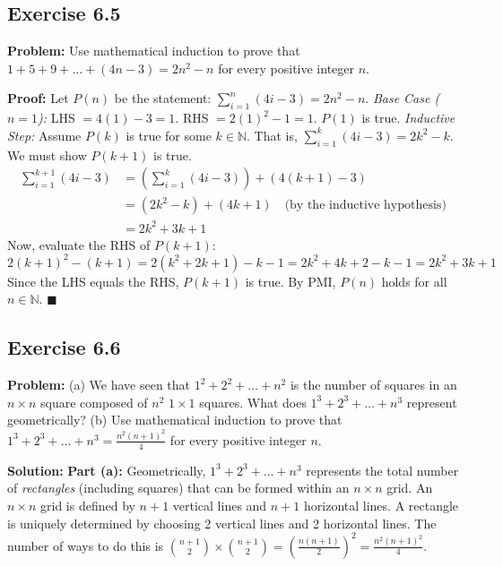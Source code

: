 \documentclass[11pt, a4paper]{article}
\theoremstyle{definition}
\theoremstyle{remark}
\newcommand{\N}{\mathbb{N}}
\begin{document}
\subsection*{Exercise 6.5}
\textbf{Problem:} Use mathematical induction to prove that $1 + 5 + 9 + \dots + (4n - 3) = 2n^2 - n$ for every positive integer $n$.

\textbf{Proof:}
Let $P(n)$ be the statement: $\sum_{i=1}^n (4i - 3) = 2n^2 - n$.
\textit{Base Case ($n=1$):} LHS $= 4(1) - 3 = 1$. RHS $= 2(1)^2 - 1 = 1$. $P(1)$ is true.
\textit{Inductive Step:} Assume $P(k)$ is true for some $k \in \N$. That is, $\sum_{i=1}^k (4i - 3) = 2k^2 - k$. We must show $P(k+1)$ is true.
\[
\begin{aligned}
\sum_{i=1}^{k+1} (4i - 3) &= \left( \sum_{i=1}^k (4i - 3) \right) + (4(k+1) - 3) \\
&= (2k^2 - k) + (4k + 1) \quad \text{(by the inductive hypothesis)} \\
&= 2k^2 + 3k + 1
\end{aligned}
\]
Now, evaluate the RHS of $P(k+1)$:
\[
2(k+1)^2 - (k+1) = 2(k^2 + 2k + 1) - k - 1 = 2k^2 + 4k + 2 - k - 1 = 2k^2 + 3k + 1
\]
Since the LHS equals the RHS, $P(k+1)$ is true. By PMI, $P(n)$ holds for all $n \in \N$. \hfill $\blacksquare$

\subsection*{Exercise 6.6}
\textbf{Problem:} 
(a) We have seen that $1^2 + 2^2 + \dots + n^2$ is the number of squares in an $n \times n$ square composed of $n^2$ $1 \times 1$ squares. What does $1^3 + 2^3 + \dots + n^3$ represent geometrically?
(b) Use mathematical induction to prove that $1^3 + 2^3 + \dots + n^3 = \frac{n^2(n+1)^2}{4}$ for every positive integer $n$.

\textbf{Solution:}
\textbf{Part (a):} Geometrically, $1^3 + 2^3 + \dots + n^3$ represents the total number of \textit{rectangles} (including squares) that can be formed within an $n \times n$ grid. An $n \times n$ grid is defined by $n+1$ vertical lines and $n+1$ horizontal lines. A rectangle is uniquely determined by choosing 2 vertical lines and 2 horizontal lines. The number of ways to do this is $\binom{n+1}{2} \times \binom{n+1}{2} = \left(\frac{n(n+1)}{2}\right)^2 = \frac{n^2(n+1)^2}{4}$.
\end{document}
